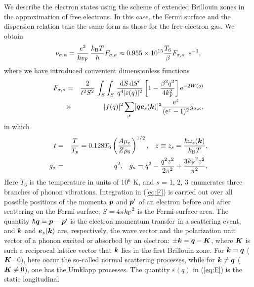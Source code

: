 We describe the electron states using the scheme of extended
Brillouin zones in the approximation of free electrons. In this
case, the Fermi surface and the dispersion relation take the same
form as those for the free electron gas. We obtain
%
\begin{equation}
      \nu_{\sigma,\kappa} =
          { e^2 \over \hbar \mbox{$v_{\rm F}$}} \, {\mbox{$k_{\rm B}$} T \over \hbar} F_{\sigma, \kappa}
          \approx 0.955 \times 10^{15}
          {T_6 \over \beta} F_{\sigma, \kappa} \; \; {\rm s}^{-1},
\label{eq:nu}
\end{equation}
%
where we have introduced convenient dimensionless functions
%
\begin{eqnarray}
      F_{\sigma, \kappa} & = & {2 \over t^2 S^2} \,
             \int_S \int_S \,
             {\mbox{d} S \, \mbox{d} S' \over q^4 |\varepsilon(q)|^2}
             \left[ 1 -  { \beta^2 q^2 \over 4 k_{\rm F}^2 } \right]
             {\rm e}^{-2W(q)}
      \nonumber \\
           & \times &
            |f(q)|^2
            \sum_s [ \mbox{\boldmath $q$} \mbox{\boldmath $e$}_s(\mbox{\boldmath $k$})]^2
            {{\rm e}^{z} \over ({\rm e}^{z} -1 )^2} g_{\sigma, \kappa},
\label{eq:F}
\end{eqnarray}
%
in which
%
\begin{eqnarray}
      t & = & { T \over T_p} = 0.128 T_6
            \left( {A \mu_e \over Z \rho_6} \right)^{1/2}, \; \; \;
            z \equiv z_s = {\hbar \omega_s(\mbox{\boldmath $k$}) \over \mbox{$k_{\rm B}$} T},
     \nonumber \\
     g_\sigma & = & q^2, \; \; \; g_\kappa=
           q^2 - {q^2 z^2 \over 2 \pi^2} + {3 \mbox{$k_{\rm F}$}^2 z^2 \over \pi^2},
\label{eq:t}
\end{eqnarray}
%
Here $T_6$ is the temperature in units of 10$^6$ K, and
$s$ = 1, 2, 3 enumerates three branches of phonon vibrations.
Integration in (\ref{eq:F}) is carried out over all possible positions of
the momenta $\mbox{\boldmath $p$}$ and $\mbox{\boldmath $p$}'$ of an electron before and after scattering
on the Fermi surface; $S = 4 \pi \mbox{$k_{\rm F}$}^2$ is the Fermi-surface area.
The quantity $\hbar \mbox{\boldmath $q$} = \mbox{\boldmath $p$} - \mbox{\boldmath $p$}'$ is the electron 
momentum transfer in a scattering event, and $\mbox{\boldmath $k$}$ and $\mbox{\boldmath $e$}_s(\mbox{\boldmath $k$})$ 
are, respectively, the wave vector and the polarization unit 
vector of a phonon excited or absorbed by an electron: 
$\pm \mbox{\boldmath $k$} = \mbox{\boldmath $q$} - \mbox{\boldmath $K$}$, where $\mbox{\boldmath $K$}$ is such a reciprocal lattice
vector that $\mbox{\boldmath $k$}$ lies in the first Brillouin zone. For $\mbox{\boldmath $k$} = \mbox{\boldmath $q$}$ 
($\mbox{\boldmath $K$}$=0), here occur the so-called normal scattering processes,
while for $\mbox{\boldmath $k$} \neq \mbox{\boldmath $q$}$ ($\mbox{\boldmath $K$}\neq 0$), one has the Umklapp processes.
The quantity $\varepsilon(q)$ in (\ref{eq:F}) is the static longitudinal
